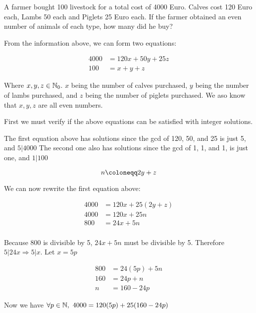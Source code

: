\documentclass[12pt]{article} %
\begin{document}
\begin{homeworkProblem}
    \begin{grayBoxed}
        A farmer bought 100 livestock for a total cost of 4000 Euro. Calves
        cost 120 Euro each, Lambs 50 each and Piglets 25 Euro each. If the farmer obtained
        an even number of animals of each type, how many did he buy?
    \end{grayBoxed}

    From the information above, we can form two equations:

    \begin{align*}
        4000 & = 120x + 50y + 25z \\
        100  & = x + y + z
    \end{align*}

    Where $x, y, z \in \mathbb{N}_0$. $x$ being the number of calves purchased, $y$ being the number of lambs
    purchased, and $z$ being the number of piglets purchased. We aso know that $x, y, z$ are all even numbers.

    First we must verify if the above equations can be satisfied with integer solutions.

    The first equation above has solutions since the gcd of 120, 50, and 25 is just 5, and $5 | 4000$
    The second one also has solutions since the gcd of 1, 1, and 1, is just one, and $1 | 100$

    $$
        n \defeq 2y + z
    $$

    We can now rewrite the first equation above:

    \begin{align*}
        4000 & = 120x + 25(2y + z) \\
        4000 & = 120x + 25n        \\
        800  & = 24x + 5n          \\
    \end{align*}

    Because 800 is divisible by 5, $24x + 5n$ must be divisible by 5. Therefore $5 | 24x \Rightarrow 5 | x$. Let $x = 5p$

    \begin{align*}
        800 & = 24(5p) + 5n \\
        160 & = 24p + n     \\
        n   & = 160 - 24p
    \end{align*}

    Now we have $\forall p \in \mathbb{N}, \ 4000 = 120(5p) + 25(160 - 24p)$


\end{homeworkProblem}
\end{document}

